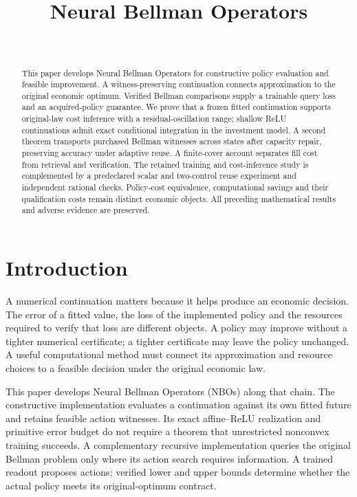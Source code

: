 \documentclass[ecta,nameyear,draft]{econsocart}
\begin{document}
\begin{frontmatter}
\title{Neural Bellman Operators}
\begin{aug}
\author[id=au1,addressref={add1}]{~}
\address[id=add1]{Peking University}
\end{aug}
\begin{abstract}
This paper develops Neural Bellman Operators for constructive policy evaluation and feasible improvement. A witness-preserving continuation connects approximation to the original economic optimum. Verified Bellman comparisons supply a trainable query loss and an acquired-policy guarantee. We prove that a frozen fitted continuation supports original-law cost inference with a residual-oscillation range; shallow ReLU continuations admit exact conditional integration in the investment model. A second theorem transports purchased Bellman witnesses across states after capacity repair, preserving accuracy under adaptive reuse. A finite-cover account separates fill cost from retrieval and verification. The retained training and cost-inference study is complemented by a predeclared scalar and two-control reuse experiment and independent rational checks. Policy-cost equivalence, computational savings and their qualification costs remain distinct economic objects. All preceding mathematical results and adverse evidence are preserved.
\end{abstract}
\begin{keyword}
\end{keyword}
\end{frontmatter}
\section{Introduction}\label{sec:introduction65}
A numerical continuation matters because it helps produce an economic decision. The error of a fitted value, the loss of the implemented policy and the resources required to verify that loss are different objects. A policy may improve without a tighter numerical certificate; a tighter certificate may leave the policy unchanged. A useful computational method must connect its approximation and resource choices to a feasible decision under the original economic law.

This paper develops Neural Bellman Operators (NBOs) along that chain. The constructive implementation evaluates a continuation against its own fitted future and retains feasible action witnesses. Its exact affine--ReLU realization and primitive error budget do not require a theorem that unrestricted nonconvex training succeeds. A complementary recursive implementation queries the original Bellman problem only where its action search requires information. A trained readout proposes actions; verified lower and upper bounds determine whether the actual policy meets its original-optimum contract.
\end{document}
